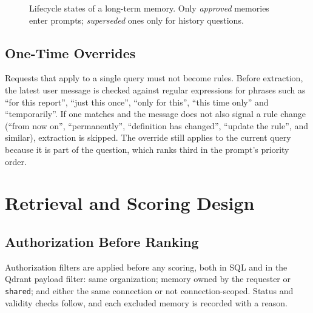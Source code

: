 \begin{figure}[H]
    \centering
    \caption{Lifecycle states of a long-term memory. Only \textit{approved} memories enter
    prompts; \textit{superseded} ones only for history questions.}
    \label{fig:lifecycle}
\end{figure}

\subsection{One-Time Overrides}
Requests that apply to a single query must not become rules. Before extraction, the latest
user message is checked against regular expressions for phrases such as ``for this report'',
``just this once'', ``only for this'', ``this time only'' and ``temporarily''. If one matches
and the message does not also signal a rule change (``from now on'', ``permanently'',
``definition has changed'', ``update the rule'', and similar), extraction is skipped. The
override still applies to the current query because it is part of the question, which
ranks third in the prompt's priority order.

\section{Retrieval and Scoring Design}

\subsection{Authorization Before Ranking}
Authorization filters are applied before any scoring, both in SQL and in the Qdrant payload
filter: same organization; memory owned by the requester or \texttt{shared}; and either the
same connection or not connection-scoped. Status and validity checks follow, and each
excluded memory is recorded with a reason.

